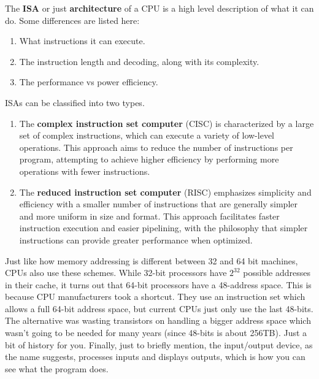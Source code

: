 \documentclass{article}
\begin{document}
    \begin{definition}
      The \textbf{ISA} or just \textbf{architecture} of a CPU is a high level description of what it can do. Some differences are listed here: 
      \begin{enumerate} 
        \item What instructions it can execute. 
        \item The instruction length and decoding, along with its complexity. 
        \item The performance vs power efficiency. 
      \end{enumerate}
      ISAs can be classified into two types. 
      \begin{enumerate} 
        \item The \textbf{complex instruction set computer} (CISC) is characterized by a large set of complex instructions, which can execute a variety of low-level operations. This approach aims to reduce the number of instructions per program, attempting to achieve higher efficiency by performing more operations with fewer instructions.
        \item The \textbf{reduced instruction set computer} (RISC) emphasizes simplicity and efficiency with a smaller number of instructions that are generally simpler and more uniform in size and format. This approach facilitates faster instruction execution and easier pipelining, with the philosophy that simpler instructions can provide greater performance when optimized.
      \end{enumerate}
    \end{definition}

    Just like how memory addressing is different between 32 and 64 bit machines, CPUs also use these schemes. While 32-bit processors have $2^{32}$ possible addresses in their cache, it turns out that 64-bit processors have a 48-address space. This is because CPU manufacturers took a shortcut. They use an instruction set which allows a full 64-bit address space, but current CPUs just only use the last 48-bits. The alternative was wasting transistors on handling a bigger address space which wasn't going to be needed for many years (since 48-bits is about 256TB). Just a bit of history for you. Finally, just to briefly mention, the input/output device, as the name suggests, processes inputs and displays outputs, which is how you can see what the program does. 
\end{document}
